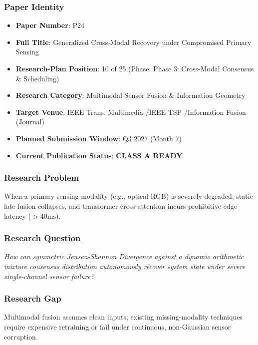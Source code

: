 \documentclass[11pt,letterpaper]{article}
\begin{document}
\subsubsection{Paper Identity}
\begin{itemize}[leftmargin=*]
    \item \textbf{Paper Number}: P24
    \item \textbf{Full Title}: Generalized Cross-\allowbreak Modal Recovery under Compromised Primary Sensing
    \item \textbf{Research-Plan Position}: 10 of 25 (Phase: Phase 3: Cross-\allowbreak Modal Consensus \& Scheduling)
    \item \textbf{Research Category}: Multimodal Sensor Fusion \& Information Geometry
    \item \textbf{Target Venue}: IEEE Trans. Multimedia /\allowbreak  IEEE TSP /\allowbreak  Information Fusion (Journal)
    \item \textbf{Planned Submission Window}: Q3 2027 (Month 7)
    \item \textbf{Current Publication Status}: \textbf{CLASS A READY}
\end{itemize}

\subsubsection{Research Problem}
When a primary sensing modality (e.g., optical RGB) is severely degraded, static late fusion collapses, and transformer cross-\allowbreak attention incurs prohibitive edge latency ($>40\text{ms}$).

\subsubsection{Research Question}
\begin{tcolorbox}[colback=blue!3!white,colframe=blue!50!black,title=Primary Scientific Question]
\textit{How can symmetric Jensen-\allowbreak Shannon Divergence against a dynamic arithmetic mixture consensus distribution autonomously recover system state under severe single-\allowbreak channel sensor failure?}
\end{tcolorbox}

\subsubsection{Research Gap}
Multimodal fusion assumes clean inputs; existing missing-\allowbreak modality techniques require expensive retraining or fail under continuous, non-\allowbreak Gaussian sensor corruption.
\end{document}
